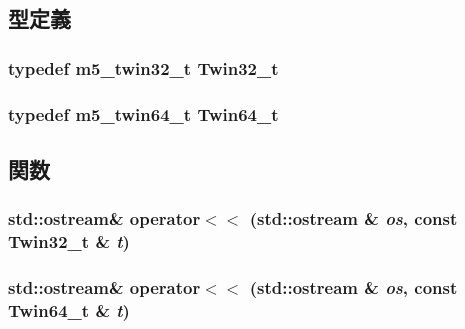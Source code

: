\subsection{型定義}
\hypertarget{bigint_8hh_aa39b720d8af8a78928ec479c910b033e}{
\subsubsection[{Twin32\_\-t}]{\setlength{\rightskip}{0pt plus 5cm}typedef {\bf m5\_\-twin32\_\-t} {\bf Twin32\_\-t}}}
\label{bigint_8hh_aa39b720d8af8a78928ec479c910b033e}
\hypertarget{bigint_8hh_acc3b3456cd2776632d23e48120b92340}{
\subsubsection[{Twin64\_\-t}]{\setlength{\rightskip}{0pt plus 5cm}typedef {\bf m5\_\-twin64\_\-t} {\bf Twin64\_\-t}}}
\label{bigint_8hh_acc3b3456cd2776632d23e48120b92340}


\subsection{関数}
\hypertarget{bigint_8hh_a595f9eddd135397efcd8bfdf262e206c}{
\subsubsection[{operator$<$$<$}]{\setlength{\rightskip}{0pt plus 5cm}std::ostream\& operator$<$$<$ (std::ostream \& {\em os}, \/  const {\bf Twin32\_\-t} \& {\em t})}}
\label{bigint_8hh_a595f9eddd135397efcd8bfdf262e206c}
\hypertarget{bigint_8hh_a0a453be4058291f0248dd92a1cc4cff3}{
\subsubsection[{operator$<$$<$}]{\setlength{\rightskip}{0pt plus 5cm}std::ostream\& operator$<$$<$ (std::ostream \& {\em os}, \/  const {\bf Twin64\_\-t} \& {\em t})}}
\label{bigint_8hh_a0a453be4058291f0248dd92a1cc4cff3}
